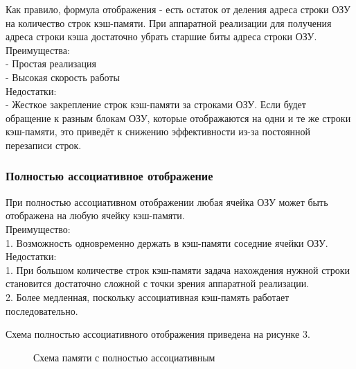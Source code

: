 \documentclass[13pt]{article}
\begin{document}
	Как правило, формула отображения - есть остаток от деления адреса строки ОЗУ на количество строк кэш-памяти. При аппаратной реализации для получения адреса строки кэша достаточно убрать старшие биты адреса строки ОЗУ.\\
	Преимущества:\\
	- Простая реализация\\
	- Высокая скорость работы\\
	Недостатки:\\
	- Жесткое закрепление строк кэш-памяти за строками ОЗУ. Если будет обращение к разным блокам ОЗУ, которые отображаются на одни и те же строки кэш-памяти, это приведёт к снижению эффективности из-за постоянной перезаписи строк.
	\subsubsection{Полностью ассоциативное отображение}
	
	При полностью ассоциативном отображении любая ячейка ОЗУ может быть отображена на любую ячейку кэш-памяти. \\
	Преимущество:\\
	1. Возможность одновременно держать в кэш-памяти соседние ячейки ОЗУ.\\
	Недостатки:\\
	1. При большом количестве строк кэш-памяти задача нахождения нужной строки становится достаточно сложной с точки зрения аппаратной реализации.\\
	2. Более медленная, поскольку ассоциативная кэш-память работает последовательно.
	
	Схема полностью ассоциативного отображения приведена на рисунке 3. 
	
	\begin{figure}[h!]
		\caption{Схема памяти с полностью ассоциативным}
	\end{figure}
\end{document}
